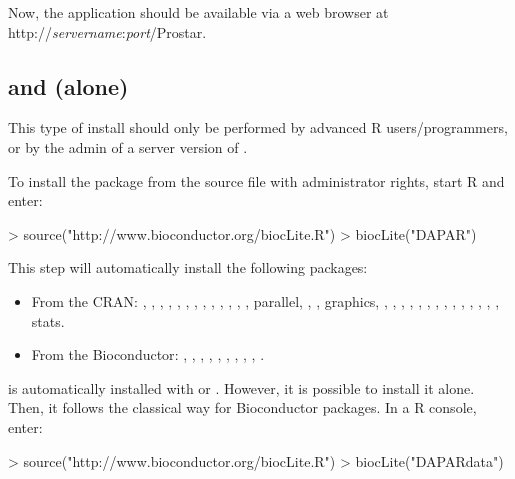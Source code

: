 \documentclass[12pt]{article}
\begin{document}
Now, the application should be available via a web browser at 
http://\emph{servername}:\emph{port}/Prostar.


\subsection{ and  (alone)}\label{sec:daparalone}

This type of install should only be performed by advanced R users/programmers, or by the admin of a server version of .

To install the package  from the source file with administrator 
rights, start R and enter:

\begin{Schunk}
\begin{Sinput}
> source("http://www.bioconductor.org/biocLite.R")
> biocLite("DAPAR")
\end{Sinput}
\end{Schunk}

This step will automatically install the following packages:
\begin{itemize}
\item {From the CRAN}: , , , , , , , ,  , , , , , parallel, , , graphics, , , , , , , , , , ,  , , , , stats.
\item {From the Bioconductor}: ,  , , , , , , , ,  .
\end{itemize}

 is automatically installed with  or . However, it is possible to install it alone. Then, it  follows 
the classical way for Bioconductor packages. In a R console, enter:
\begin{Schunk}
\begin{Sinput}
> source("http://www.bioconductor.org/biocLite.R")
> biocLite("DAPARdata")
\end{Sinput}
\end{Schunk}
\end{document}
